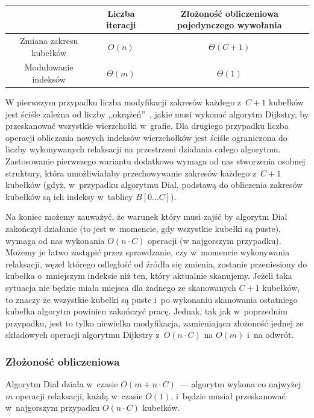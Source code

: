 \begin{center}
	\begin{tabular}{ccc}
		& Liczba iteracji & Złożoność obliczeniowa pojedynczego wywołania \\
		\hline
		Zmiana zakresu kubełków & $ O \left( n \right) $ & $ \Theta \left( C + 1 \right) $ \\
		Modulowanie indeksów & $ \Theta \left( m \right) $ & $ \Theta \left( 1 \right) $ \\
		\hline
	\end{tabular}
\end{center}

W pierwszym przypadku liczba modyfikacji zakresów każdego z~$C+1$ kubełków jest ściśle zależna od liczby ,,okrążeń''~, jakie musi wykonać algorytm Dijkstry, by przeskanować wszystkie wierzchołki w~grafie.
Dla drugiego przypadku liczba operacji obliczania nowych indeksów wierzchołków jest ściśle ograniczona do liczby wykonywanych relaksacji na przestrzeni działania całego algorytmu.
Zastosowanie pierwszego wariantu dodatkowo wymaga od nas stworzenia osobnej struktury, która umożliwiałaby przechowywanie zakresów każdego z~$C+1$ kubełków (gdyż, w~przypadku algorytmu Dial, podstawą do obliczenia zakresów kubełków są ich indeksy w~tablicy $B \left[ 0 \dots C \right]$).

Na koniec możemy zauważyć, że warunek który musi zajść by algorytm Dial zakończył działanie (to jest w~momencie, gdy wszystkie kubełki są puste), wymaga od nas wykonania $O \left( n \cdot C \right)$ operacji (w najgorszym przypadku). Możemy je łatwo zastąpić przez sprawdzanie, czy w~momencie wykonywania relaksacji, węzeł którego odległość od źródła się zmienia, zostanie przeniesiony do kubełka o~mniejszym indeksie niż ten, który aktualnie skanujemy.
Jeżeli taka sytuacja nie będzie miała miejsca dla żadnego ze skanowanych $C+1$ kubełków, to znaczy że wszystkie kubełki są puste i~po wykonaniu skanowania ostatniego kubełka algorytm powinien zakończyć pracę.
Jednak, tak jak w~poprzednim przypadku, jest to tylko niewielka modyfikacja, zamieniająca złożoność jednej ze składowych operacji algorytmu Dijkstry z~$O \left( n \cdot C \right)$ na $ O \left( m \right)$ i~na odwrót.


\subsubsection{Złożoność obliczeniowa}


Algorytm Dial działa w~czasie $O \left( m + n \cdot C \right)$~--- algorytm wykona co najwyżej $m$ operacji relaksacji, każdą w~czasie $O \left( 1 \right)$, i~będzie musiał przeskanować w~najgorszym przypadku $O \left( n \cdot C \right)$ kubełków.



